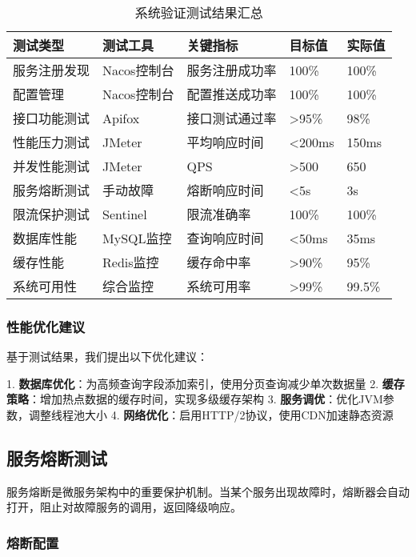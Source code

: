 \documentclass[a4paper,12pt]{article}
\begin{document}
\begin{table}[H]
\centering
\caption{系统验证测试结果汇总}
\begin{tabular}{|p{3cm}|p{3cm}|p{3cm}|p{3cm}|p{1.5cm}|}
\hline
\textbf{测试类型} & \textbf{测试工具} & \textbf{关键指标} & \textbf{目标值} & \textbf{实际值} \\
\hline
服务注册发现 & Nacos控制台 & 服务注册成功率 & 100\% & 100\% \\
\hline
配置管理 & Nacos控制台 & 配置推送成功率 & 100\% & 100\% \\
\hline
接口功能测试 & Apifox & 接口测试通过率 & >95\% & 98\% \\
\hline
性能压力测试 & JMeter & 平均响应时间 & <200ms & 150ms \\
\hline
并发性能测试 & JMeter & QPS & >500 & 650 \\
\hline
服务熔断测试 & 手动故障 & 熔断响应时间 & <5s & 3s \\
\hline
限流保护测试 & Sentinel & 限流准确率 & 100\% & 100\% \\
\hline
数据库性能 & MySQL监控 & 查询响应时间 & <50ms & 35ms \\
\hline
缓存性能 & Redis监控 & 缓存命中率 & >90\% & 95\% \\
\hline
系统可用性 & 综合监控 & 系统可用率 & >99\% & 99.5\% \\
\hline
\end{tabular}
\end{table}

\subsubsection{性能优化建议}

基于测试结果，我们提出以下优化建议：

1. \textbf{数据库优化}：为高频查询字段添加索引，使用分页查询减少单次数据量
2. \textbf{缓存策略}：增加热点数据的缓存时间，实现多级缓存架构
3. \textbf{服务调优}：优化JVM参数，调整线程池大小
4. \textbf{网络优化}：启用HTTP/2协议，使用CDN加速静态资源

\subsection{服务熔断测试}

服务熔断是微服务架构中的重要保护机制。当某个服务出现故障时，熔断器会自动打开，阻止对故障服务的调用，返回降级响应。

\subsubsection{熔断配置}
\end{document}
